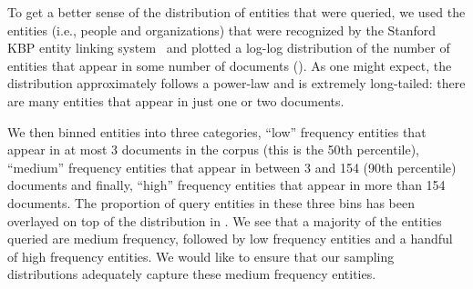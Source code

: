 To get a better sense of the distribution of entities that were queried, we used the entities (i.e., people and organizations) that were recognized by the Stanford KBP entity linking system~\citep{stanford2017kbp} and plotted a log-log distribution of the number of entities that appear in some number of documents ().
As one might expect, the distribution approximately follows a power-law and is extremely long-tailed: there are many entities that appear in just one or two documents. 

We then binned entities into three categories, ``low'' frequency entities that appear in at most 3 documents in the corpus (this is the 50th percentile), ``medium'' frequency entities that appear in between 3 and 154 (90th percentile) documents and finally, ``high'' frequency entities that appear in more than 154 documents.
The proportion of query entities in these three bins has been overlayed on top of the distribution in .
We see that a majority of the entities queried are medium frequency, followed by low frequency entities and a handful of high frequency entities.
We would like to ensure that our sampling distributions adequately capture these medium frequency entities. 

